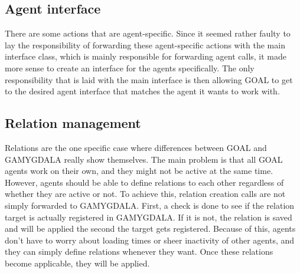 \subsection{Agent interface}
There are some actions that are agent-specific. Since it seemed rather faulty to lay the responsibility of forwarding these agent-specific actions with the main interface class, which is mainly responsible for forwarding agent calls, it made more sense to create an interface for the agents specifically. The only responsibility that is laid with the main interface is then allowing GOAL to get to the desired agent interface that matches the agent it wants to work with.

\subsection{Relation management}
Relations are the one specific case where differences between GOAL and GAMYGDALA really show themselves. The main problem is that all GOAL agents work on their own, and they might not be active at the same time. However, agents should be able to define relations to each other regardless of whether they are active or not.
To achieve this, relation creation calls are not simply forwarded to GAMYGDALA. First, a check is done to see if the relation target is actually registered in GAMYGDALA. If it is not, the relation is saved and will be applied the second the target gets registered.
Because of this, agents don't have to worry about loading times or sheer inactivity of other agents, and they can simply define relations whenever they want. Once these relations become applicable, they will be applied.